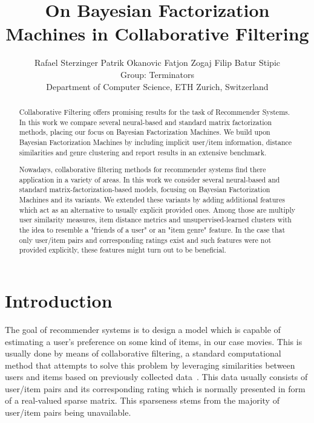 \documentclass[10pt,conference,compsocconf]{IEEEtran}
\newcommand{\spacing}{\hspace{1cm}}
\begin{document}
    \setlength{\abovedisplayskip}{2pt}
    \setlength{\belowdisplayskip}{2pt}
    \setlength{\abovedisplayshortskip}{2pt}
    \setlength{\belowdisplayshortskip}{2pt}
    \title{On Bayesian Factorization Machines in Collaborative Filtering}

    \author{
        Rafael Sterzinger \spacing Patrik Okanovic \spacing Fatjon Zogaj \spacing Filip Batur Stipic\\
        Group: Terminators\\
        Department of Computer Science, ETH Zurich, Switzerland
    }

    \maketitle

    \begin{abstract}
        Collaborative Filtering offers promising results for the task of Recommender Systems.
        In this work we compare several neural-based and standard matrix factorization methods, placing our focus on Bayesian Factorization Machines.
        We build upon Bayesian Factorization Machines by including implicit user/item information, distance similarities and genre clustering and report results in an extensive benchmark.

    \end{abstract}
 \begin{abstract}
        Nowadays, collaborative filtering methods for recommender systems find there application in a variety of areas.
        In this work we consider several neural-based and standard matrix-factorization-based models, focusing on Bayesian Factorization Machines and its variants.
        We extended these variants by adding additional features which act as an alternative to usually explicit provided ones.
        Among those are multiply user similarity measures, item distance metrics and unsupervised-learned clusters with the idea to resemble a "friends of a user" or an "item genre" feature.
        In the case that only user/item pairs and corresponding ratings exist and such features were not provided explicitly, these features might turn out to be beneficial.
    \end{abstract}


    \section{Introduction}

    The goal of recommender systems is to design a model which is capable of estimating a user's preference on some kind of items, in our case movies.
    This is usually done by means of collaborative filtering, a standard computational method that attempts to solve this problem by leveraging similarities between users and items based on previously collected data~\cite{CF_survey}.
    This data usually consists of user/item pairs and its corresponding rating which is normally presented in form of a real-valued sparse matrix.
    This sparseness stems from the majority of user/item pairs being unavailable.
\end{document}
